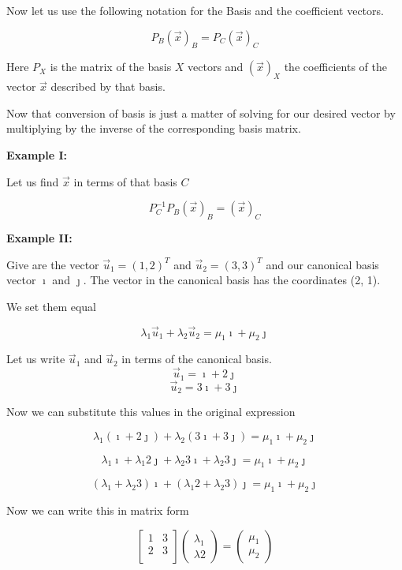 Now let us use the following notation for the Basis and the coefficient vectors.

\[P_B {(\vec{x})}_B = P_C {(\vec{x})}_C\]

Here \(P_{X}\) is the matrix of the basis \(X\) vectors and \({(\vec{x})}_X\) the coefficients of the
vector \(\vec{x}\) described by that basis.
\vspace{\baselineskip}

Now that conversion of basis is just a matter of solving for 
our desired vector by multiplying
by the inverse of the corresponding basis matrix.
\vspace{\baselineskip}

\textbf{Example I:}
\vspace{\baselineskip}

Let us find \(\vec{x}\) in terms of that basis \(C\)

\[P_{C}^{-1} P_B {(\vec{x})}_B = {(\vec{x})}_C\]

\textbf{Example II:}
\vspace{\baselineskip}

Give are the vector \(\vec{u}_1 = {(1,2)}^T\) and \(\vec{u}_2 = {(3, 3)}^T\)
and our canonical basis vector \(\imath\) and \(\jmath\). The
vector in the canonical basis has the coordinates (2, 1). 
\vspace{\baselineskip}

We set them equal

\[\lambda_1 \vec{u}_1 + \lambda_2 \vec{u}_2 = \mu_1 \imath + \mu_2 \jmath \]

Let us write \(\vec{u}_1\) and \(\vec{u}_2\) in terms of the canonical basis.
\[\vec{u}_1 = \imath + 2 \jmath\]
\[\vec{u}_2 = 3 \imath + 3 \jmath\]

Now we can substitute this values in the original expression

\[\lambda_1 (\imath + 2 \jmath) + \lambda_2 (3 \imath + 3 \jmath) = \mu_1 \imath + \mu_2 \jmath \]

\[\lambda_1 \imath + \lambda_1 2 \jmath + \lambda_2 3 \imath + \lambda_2 3 \jmath = \mu_1 \imath + \mu_2 \jmath \]

\[(\lambda_1  +  \lambda_2 3)\imath + (\lambda_1 2  + \lambda_2 3) \jmath = \mu_1 \imath + \mu_2 \jmath \]

Now we can write this in matrix form

\[
\begin{bmatrix}
    1 & 3 \\
    2 & 3 \\
\end{bmatrix} \begin{pmatrix}
    \lambda_1 \\ \lambda2
\end{pmatrix} = \begin{pmatrix}
    \mu_1 \\ \mu_2
\end{pmatrix}
\]

